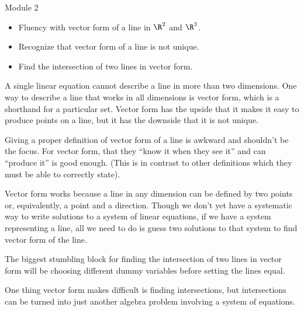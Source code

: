 \begin{lesson}

	Module 2

	\begin{itemize}
		\item Fluency with vector form of a line in $\R^2$ and $\R^3$.
		\item Recognize that vector form of a line is not unique.
		\item Find the intersection of two lines in vector form.
	\end{itemize}

	A single linear equation cannot describe a line in more than two dimensions.
	One way to describe a line that works in all dimensions is vector form, which
	is a shorthand for a particular set. Vector form has the upside that it makes it easy
	to produce points on a line, but it has the downside that it is not unique.

	\begin{annotation}
		\begin{notes}
			Giving a proper definition of vector form of a line is awkward and
			shouldn't be the focus. For vector form, that they ``know it when they see it''
			and can ``produce it'' is good enough. (This is in contrast to other definitions
			which they must be able to correctly state).
		\end{notes}
	\end{annotation}
	Vector form works because a line in any dimension can be defined by two
	points or, equivalently, a point and a direction. Though we don't yet have
	a systematic way to write solutions to a system of linear equations,
	if we have a system representing a line, all we need to do is guess two
	solutions to that system to find vector form of the line.


	\begin{annotation}
		\begin{notes}
			The biggest stumbling block for finding the intersection of two lines
			in vector form will be choosing different dummy variables before
			setting the lines equal.
		\end{notes}
	\end{annotation}
	One thing vector form makes difficult is finding intersections, but intersections
	can be turned into just another algebra problem involving a system of equations.

\end{lesson}

